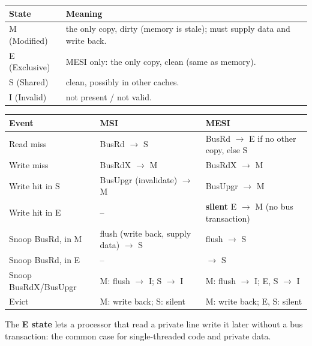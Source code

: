 \begin{center}
\small
\begin{tabular}{@{}p{2.6cm}p{11.6cm}@{}}
\toprule
State & Meaning \\
\midrule
M (Modified) & the only copy, dirty (memory is stale); must supply data and write back. \\
E (Exclusive) & MESI only: the only copy, clean (same as memory). \\
S (Shared) & clean, possibly in other caches. \\
I (Invalid) & not present / not valid. \\
\bottomrule
\end{tabular}
\end{center}
\begin{center}
\small
\begin{tabular}{@{}lll@{}}
\toprule
Event & MSI & MESI \\
\midrule
Read miss & BusRd $\to$ S & BusRd $\to$ E if no other copy, else S \\
Write miss & BusRdX $\to$ M & BusRdX $\to$ M \\
Write hit in S & BusUpgr (invalidate) $\to$ M & BusUpgr $\to$ M \\
Write hit in E & -- & \textbf{silent} E $\to$ M (no bus transaction) \\
Snoop BusRd, in M & flush (write back, supply data) $\to$ S & flush $\to$ S \\
Snoop BusRd, in E & -- & $\to$ S \\
Snoop BusRdX/BusUpgr & M: flush $\to$ I; S $\to$ I & M: flush $\to$ I; E, S $\to$ I \\
Evict & M: write back; S: silent & M: write back; E, S: silent \\
\bottomrule
\end{tabular}
\end{center}
The \textbf{E state} lets a processor that read a private line write it later without
a bus transaction: the common case for single-threaded code and private data.

